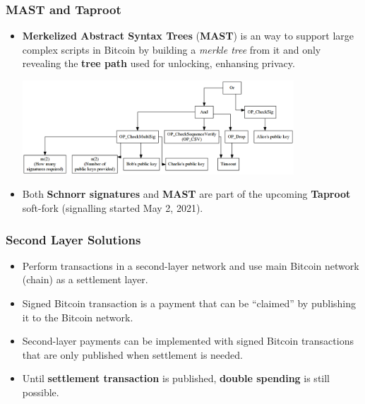 \documentclass{beamer}
\begin{document}
\begin{frame}
  \frametitle{MAST and Taproot}
  \begin{itemize}
  \item \textbf{Merkelized Abstract Syntax Trees} (\textbf{MAST}) is an way to
    support large complex scripts in Bitcoin by building a \textit{merkle tree}
    from it and only revealing the \textbf{tree path} used for unlocking,
    enhansing privacy.
    \begin{center}
      \includegraphics[width=0.8\textwidth]{mast}
    \end{center}
  \item Both \textbf{Schnorr signatures} and \textbf{MAST} are part of the
    upcoming \textbf{Taproot} soft-fork (signalling started May 2, 2021).
  \end{itemize}
\end{frame}

\begin{frame}
  \frametitle{Second Layer Solutions}
  \begin{itemize}
  \item Perform transactions in a second-layer network and use main Bitcoin
    network (chain) as a settlement layer.
  \item Signed Bitcoin transaction is a payment that can be ``claimed'' by
    publishing it to the Bitcoin network.
  \item Second-layer payments can be implemented with signed Bitcoin
    transactions that are only published when settlement is needed.
  \item Until \textbf{settlement transaction} is published, \textbf{double
      spending} is still possible.
  \end{itemize}
\end{frame}
\end{document}

